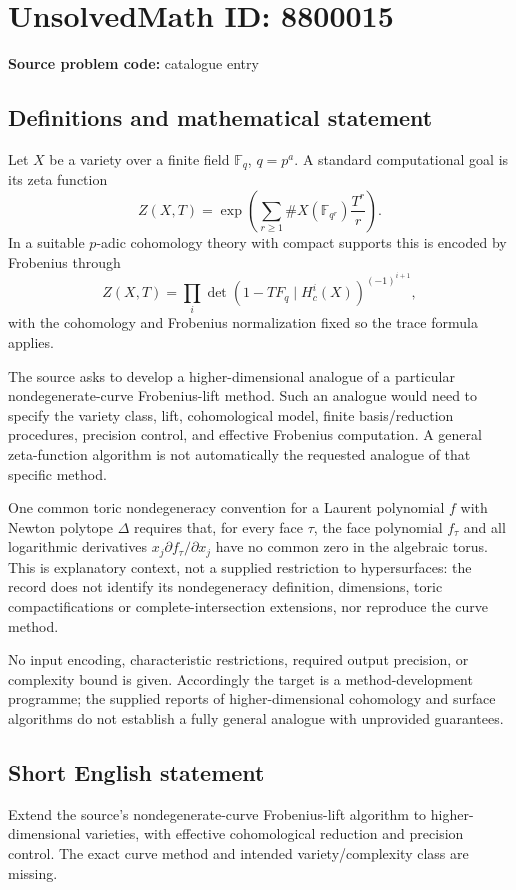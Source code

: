 \documentclass[11pt]{article}
\newcommand{\F}{\mathbb{F}}
\begin{document}
\section*{UnsolvedMath ID: 8800015}
\textbf{Source problem code:} catalogue entry
\subsection{Definitions and mathematical statement}
Let $X$ be a variety over a finite field $\F_q$, $q=p^a$. A standard computational goal is its zeta function
\[
Z(X,T)=\exp\left(\sum_{r\geq1}\#X(\F_{q^r})\frac{T^r}{r}\right).
\]
In a suitable $p$-adic cohomology theory with compact supports this is encoded by Frobenius through
\[
Z(X,T)=\prod_i\det(1-TF_q\mid H_c^i(X))^{(-1)^{i+1}},
\]
with the cohomology and Frobenius normalization fixed so the trace formula applies.

The source asks to develop a higher-dimensional analogue of a particular nondegenerate-curve Frobenius-lift method. Such an analogue would need to specify the variety class, lift, cohomological model, finite basis/reduction procedures, precision control, and effective Frobenius computation. A general zeta-function algorithm is not automatically the requested analogue of that specific method.

One common toric nondegeneracy convention for a Laurent polynomial $f$ with Newton polytope $\Delta$ requires that, for every face $\tau$, the face polynomial $f_\tau$ and all logarithmic derivatives $x_j\partial f_\tau/\partial x_j$ have no common zero in the algebraic torus. This is explanatory context, not a supplied restriction to hypersurfaces: the record does not identify its nondegeneracy definition, dimensions, toric compactifications or complete-intersection extensions, nor reproduce the curve method.

No input encoding, characteristic restrictions, required output precision, or complexity bound is given. Accordingly the target is a method-development programme; the supplied reports of higher-dimensional cohomology and surface algorithms do not establish a fully general analogue with unprovided guarantees.
\subsection{Short English statement}
Extend the source's nondegenerate-curve Frobenius-lift algorithm to higher-dimensional varieties, with effective cohomological reduction and precision control. The exact curve method and intended variety/complexity class are missing.
\end{document}
